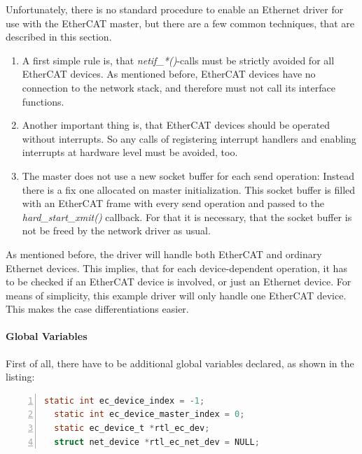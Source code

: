 \documentclass[a4paper,12pt,BCOR6mm,bibtotoc,idxtotoc]{scrbook}
\begin{document}
Unfortunately, there is no standard procedure to enable an Ethernet
driver for use with the EtherCAT master, but there are a few common
techniques, that are described in this section.

\begin{enumerate}
\item A first simple rule is, that \textit{netif\_*()}-calls must be
  strictly avoided for all EtherCAT devices. As mentioned before,
  EtherCAT devices have no connection to the network stack, and
  therefore must not call its interface functions.
\item Another important thing is, that EtherCAT devices should be
  operated without interrupts. So any calls of registering interrupt
  handlers and enabling interrupts at hardware level must be avoided,
  too.
\item The master does not use a new socket buffer for each send
  operation: Instead there is a fix one allocated on master
  initialization. This socket buffer is filled with an EtherCAT frame
  with every send operation and passed to the
  \textit{hard\_start\_xmit()} callback. For that it is necessary,
  that the socket buffer is not be freed by the network driver as
  usual.
\end{enumerate}

As mentioned before, the driver will handle both EtherCAT and ordinary
Ethernet devices. This implies, that for each device-dependent
operation, it has to be checked if an EtherCAT device is involved, or
just an Ethernet device. For means of simplicity, this example driver
will only handle one EtherCAT device. This makes the case
differentiations easier.

\paragraph{Global Variables}

First of all, there have to be additional global variables declared,
as shown in the listing:

\begin{lstlisting}[gobble=2,language=C,numbers=left]
  static int ec_device_index = -1;
  static int ec_device_master_index = 0;
  static ec_device_t *rtl_ec_dev;
  struct net_device *rtl_ec_net_dev = NULL;
\end{lstlisting}
\end{document}
